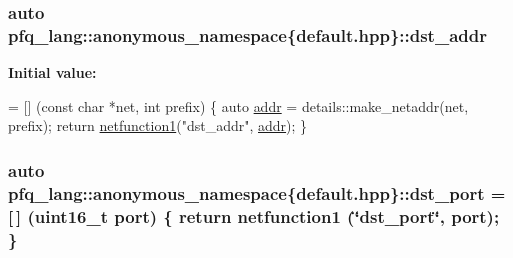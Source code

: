 \hypertarget{namespacepfq__lang_1_1anonymous__namespace_02default_8hpp_03_a4b72bac7c3af312ffe7c670eb2583f9a}{
\subsubsection[{dst\+\_\+addr}]{\setlength{\rightskip}{0pt plus 5cm}auto pfq\+\_\+lang\+::anonymous\+\_\+namespace\{default.\+hpp\}\+::dst\+\_\+addr}}\label{namespacepfq__lang_1_1anonymous__namespace_02default_8hpp_03_a4b72bac7c3af312ffe7c670eb2583f9a}
{\bfseries Initial value\+:}
\begin{DoxyCode}
= [] (\textcolor{keyword}{const} \textcolor{keywordtype}{char} *net, \textcolor{keywordtype}{int} prefix)
        \{
            \textcolor{keyword}{auto} \hyperlink{namespacepfq__lang_1_1anonymous__namespace_02default_8hpp_03_aafce8334d1be83bff9a2115439c8c453}{addr} = details::make\_netaddr(net, prefix);
            \textcolor{keywordflow}{return} \hyperlink{namespacepfq__lang_af215f25fa7ebd61fdc90cf0ef78a3164}{netfunction1}(\textcolor{stringliteral}{"dst\_addr"}, \hyperlink{namespacepfq__lang_1_1anonymous__namespace_02default_8hpp_03_aafce8334d1be83bff9a2115439c8c453}{addr});
        \}
\end{DoxyCode}
\hypertarget{namespacepfq__lang_1_1anonymous__namespace_02default_8hpp_03_aceccbe6ec912638fb8d5d3d9e0372a09}{
\subsubsection[{dst\+\_\+port}]{\setlength{\rightskip}{0pt plus 5cm}auto pfq\+\_\+lang\+::anonymous\+\_\+namespace\{default.\+hpp\}\+::dst\+\_\+port = \mbox{[}$\,$\mbox{]} (uint16\+\_\+t {\bf port}) \{ return {\bf netfunction1} (\char`\"{}dst\+\_\+port\char`\"{}, port); \}}}\label{namespacepfq__lang_1_1anonymous__namespace_02default_8hpp_03_aceccbe6ec912638fb8d5d3d9e0372a09}
